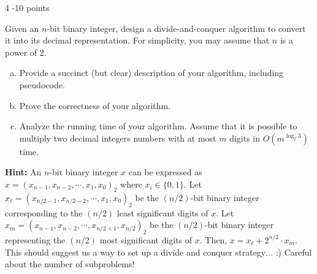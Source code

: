 \documentclass{common/cs157}
\begin{document}
\begin{problem}{4 -10 points}

 Given an $n$-bit binary integer, design a divide-and-conquer algorithm to convert it into its decimal representation. For simplicity, you may assume that $n$ is a power of 2. 

\begin{enumerate}[(a)]
    \item Provide a succinct (but clear) description of your algorithm, including pseudocode.
    \item Prove the correctness of your algorithm.
    \item Analyze the running time of your algorithm. Assume that it is possible to multiply two decimal integers numbers with at most $m$ digits in $O(m^{\log_2 3})$ time. 
\end{enumerate}

\textbf{Hint:} An $n$-bit binary integer $x$ can be expressed as $x = (x_{n - 1}, x_{n - 2}, \cdots, x_1, x_0)_2$ where $x_i \in \{0, 1\}$. Let $x_{\ell} = (x_{n/2 - 1}, x_{n/2 - 2}, \cdots, x_1, x_0)_2$ be the $(n/2)$-bit binary integer corresponding to the $(n/2)$ least significant digits of $x$. Let $x_m = (x_{n - 1}, x_{n - 2}, \cdots, x_{n/2 + 1}, x_{n/2})_2$ be the $(n/2)$-bit binary integer representing the $(n / 2)$ most significant digits of $x$. Then, $x = x_{\ell} + 2^{n/2} \cdot x_{m}$. This should suggest us a way to set up a divide and conquer strategy$\dots$ :) Careful about the number of subproblems!
\end{problem}
\end{document}
